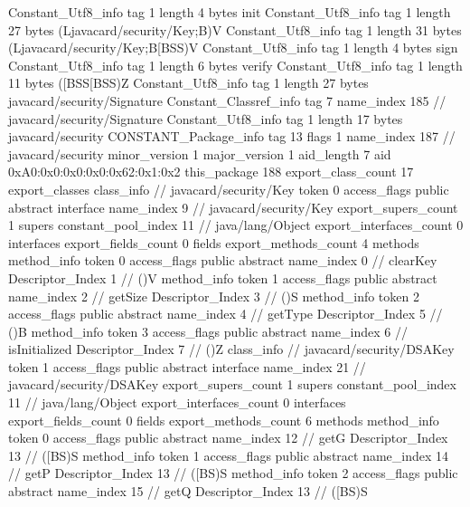 {{{		}
		Constant_Utf8_info {
			tag	1
			length	4
			bytes	init
		}
		Constant_Utf8_info {
			tag	1
			length	27
			bytes	(Ljavacard/security/Key;B)V
		}
		Constant_Utf8_info {
			tag	1
			length	31
			bytes	(Ljavacard/security/Key;B[BSS)V
		}
		Constant_Utf8_info {
			tag	1
			length	4
			bytes	sign
		}
		Constant_Utf8_info {
			tag	1
			length	6
			bytes	verify
		}
		Constant_Utf8_info {
			tag	1
			length	11
			bytes	([BSS[BSS)Z
		}
		Constant_Utf8_info {
			tag	1
			length	27
			bytes	javacard/security/Signature
		}
		Constant_Classref_info {
			tag	7
			name_index	185		// javacard/security/Signature
		}
		Constant_Utf8_info {
			tag	1
			length	17
			bytes	javacard/security
		}
		CONSTANT_Package_info {
			tag	13
			flags	1
			name_index	187		// javacard/security
			minor_version	1
			major_version	1
			aid_length	7
			aid	0xA0:0x0:0x0:0x0:0x62:0x1:0x2
		}
	}
	this_package	188
	export_class_count	17
	export_classes {
		class_info {		// javacard/security/Key
			token	0
			access_flags	public abstract interface
			name_index	9		// javacard/security/Key
			export_supers_count	1
			supers {
				constant_pool_index	11		// java/lang/Object
			}
			export_interfaces_count	0
			interfaces {
			}
			export_fields_count	0
			fields {
			}
			export_methods_count	4
			methods {
				method_info {
					token	0
					access_flags	public abstract
					name_index	0		// clearKey
					Descriptor_Index	1		// ()V
				}
				method_info {
					token	1
					access_flags	public abstract
					name_index	2		// getSize
					Descriptor_Index	3		// ()S
				}
				method_info {
					token	2
					access_flags	public abstract
					name_index	4		// getType
					Descriptor_Index	5		// ()B
				}
				method_info {
					token	3
					access_flags	public abstract
					name_index	6		// isInitialized
					Descriptor_Index	7		// ()Z
				}
			}
		}
		class_info {		// javacard/security/DSAKey
			token	1
			access_flags	public abstract interface
			name_index	21		// javacard/security/DSAKey
			export_supers_count	1
			supers {
				constant_pool_index	11		// java/lang/Object
			}
			export_interfaces_count	0
			interfaces {
			}
			export_fields_count	0
			fields {
			}
			export_methods_count	6
			methods {
				method_info {
					token	0
					access_flags	public abstract
					name_index	12		// getG
					Descriptor_Index	13		// ([BS)S
				}
				method_info {
					token	1
					access_flags	public abstract
					name_index	14		// getP
					Descriptor_Index	13		// ([BS)S
				}
				method_info {
					token	2
					access_flags	public abstract
					name_index	15		// getQ
					Descriptor_Index	13		// ([BS)S
}}}}}
